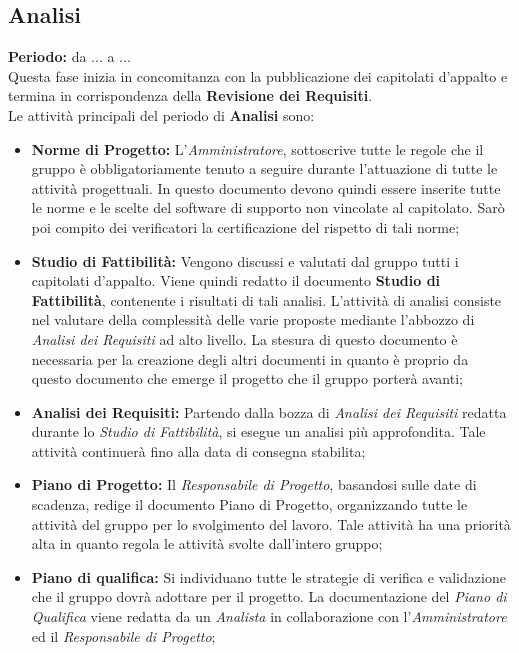 	\subsection{Analisi}
	\textbf{Periodo:} da ... a ... \\
	Questa fase inizia in concomitanza con la pubblicazione dei capitolati d'appalto e termina in 		 corrispondenza della \textbf{Revisione dei Requisiti}. \\
	Le attività principali del periodo di \textbf{Analisi} sono: \\
	\begin{itemize}
		\item \textbf{Norme di Progetto:} L'\textit{Amministratore}, sottoscrive tutte le regole che il gruppo è obbligatoriamente tenuto a seguire durante l'attuazione di tutte le attività progettuali. In questo documento devono quindi essere inserite tutte le norme e le scelte del software di supporto non vincolate al capitolato. Sarò poi compito dei verificatori la certificazione del rispetto di tali norme;
		\item \textbf{Studio di Fattibilità:} Vengono discussi e valutati dal gruppo tutti i capitolati d'appalto. Viene quindi redatto il documento \textbf{Studio di Fattibilità}, contenente i risultati di tali analisi. L'attività di analisi consiste nel valutare della complessità delle varie proposte mediante l'abbozzo di \textit{Analisi dei Requisiti} ad alto livello. La stesura di questo documento è necessaria per la creazione degli altri documenti in quanto è proprio da questo documento che emerge il progetto che il gruppo porterà avanti;
		\item \textbf{Analisi dei Requisiti:} Partendo dalla bozza di \textit{Analisi dei Requisiti} redatta durante lo \textit{Studio di Fattibilità}, si esegue un analisi più approfondita. Tale attività continuerà fino alla data di consegna stabilita;
		\item \textbf{Piano di Progetto:} Il \textit{Responsabile di Progetto}, basandosi sulle date di scadenza, redige il documento Piano di Progetto, organizzando tutte le attività del gruppo per lo svolgimento del lavoro. Tale attività ha una priorità alta in quanto regola le attività svolte dall'intero gruppo;
		\item \textbf{Piano di qualifica:} Si individuano tutte le strategie di verifica e validazione che il gruppo dovrà adottare per il progetto. La documentazione del \textit{Piano di Qualifica} viene redatta da un \textit{Analista} in collaborazione con l'\textit{Amministratore} ed il \textit{Responsabile di Progetto};

\end{itemize}
